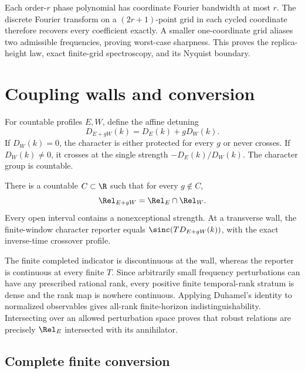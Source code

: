Each order-$r$ phase polynomial has coordinate Fourier bandwidth at most
$r$.  The discrete Fourier transform on a $(2r+1)$-point grid in each
cycled coordinate therefore recovers every coefficient exactly.  A smaller
one-coordinate grid aliases two admissible frequencies, proving worst-case
sharpness.  This proves the replica-height law, exact finite-grid
spectroscopy, and its Nyquist boundary.

\section{Coupling walls and conversion}

For countable profiles $E,W$, define the affine detuning
\[
 D_{E+gW}(k)=D_E(k)+gD_W(k).
\]
If $D_W(k)=0$, the character is either protected for every $g$ or never
crosses.  If $D_W(k)\ne0$, it crosses at the single strength
$-D_E(k)/D_W(k)$.  The character group is countable.

\begin{theorem}
There is a countable $C\subset\R$ such that for every $g\notin C$,
\[
 \Rel_{E+gW}=\Rel_E\cap\Rel_W.
\]
Every open interval contains a nonexceptional strength.  At a transverse
wall, the finite-window character reporter equals
$\sinc(TD_{E+gW}(k))$, with the exact inverse-time crossover profile.
\end{theorem}

The finite completed indicator is discontinuous at the wall, whereas the
reporter is continuous at every finite $T$.  Since arbitrarily small
frequency perturbations can have any prescribed rational rank, every
positive finite temporal-rank stratum is dense and the rank map is nowhere
continuous.  Applying Duhamel's identity to normalized observables gives
all-rank finite-horizon indistinguishability.  Intersecting over an allowed
perturbation space proves that robust relations are precisely
$\Rel_E$ intersected with its annihilator.

\subsection{Complete finite conversion}

